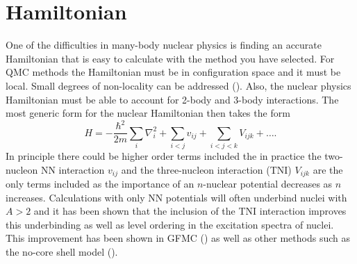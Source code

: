 \section{Hamiltonian}
One of the difficulties in many-body nuclear physics is finding an accurate Hamiltonian that is easy to calculate with the method you have selected. For QMC methods the Hamiltonian must be in configuration space and it must be local. Small degrees of non-locality can be addressed (\cite{lynn2012,lynn2013}). Also, the nuclear physics Hamiltonian must be able to account for 2-body and 3-body interactions. The most generic form for the nuclear Hamiltonian then takes the form
\begin{equation}
   H = -\frac{\hbar^2}{2m}\sum\limits_i \nabla_i^2 + \sum\limits_{i<j} v_{ij} + \sum\limits_{i<j<k} V_{ijk} + \ldots.
\end{equation}
In principle there could be higher order terms included the in practice the two-nucleon NN interaction $v_{ij}$ and the three-nucleon interaction (TNI) $V_{ijk}$ are the only terms included as the importance of an $n$-nuclear potential decreases as $n$ increases. Calculations with only NN potentials will often underbind nuclei with $A>2$ and it has been shown that the inclusion of the TNI interaction improves this underbinding as well as level ordering in the excitation spectra of nuclei. This improvement has been shown in GFMC (\cite{fantoni2008}) as well as other methods such as the no-core shell model (\cite{navratil2003}).

